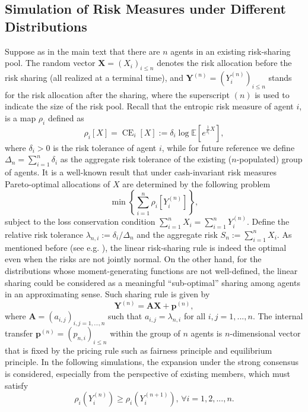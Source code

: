 \documentclass[fleqn,mnsc,nonblindrev]{informs4}
\newcommand{\CE}{\operatorname{CE}}
\begin{document}
\subsection{Simulation of Risk Measures under Different Distributions}
Suppose as in the main text that there are $n$ agents in an existing risk-sharing pool. The random vector $\mathbf{X}=(X_i)_{i\leq n}$ denotes the risk allocation before the risk sharing  (all realized at a terminal time), and $\mathbf{Y}^{(n)}=(Y_i^{(n)})_{i\leq n}$ stands for the risk allocation after the sharing, where the superscript $(n)$ is used to indicate the size of the risk pool. Recall that the entropic risk measure of agent $i$, is a map  $\rho_i$ defined as 
\begin{equation*}
\rho_i[X]=\CE_i[X]:=\delta_i\log\mathbb{E}[e^{\frac{1}{\delta_i}X}],
\end{equation*}
where $\delta_i>0$ is the risk tolerance of agent $i$, while for future reference we define $\Delta_n=\sum_{i=1}^n\delta_i$ as the aggregate risk tolerance of the existing ($n$-populated) group of agents. It is a well-known result that under cash-invariant risk measures Pareto-optimal allocations of $X$ are determined by the following problem 
\begin{equation}\label{app:eq:sharingproblem}
\min\left\{\sum_{i=1}^n\rho_i[Y_i^{(n)}]\right\},
\end{equation}
subject to the loss conservation condition $\sum_{i=1}^n X_i=\sum_{i=1}^n Y_i^{(n)}.$ Define the relative risk tolerance $\lambda_{n,i}:=\delta_i/\Delta_n$ and the aggregate risk $S_n:=\sum_{i=1}^n X_i.$ As mentioned before (see e.g. \cite{barrieu2005inf}), the linear risk-sharing rule is indeed the optimal even when the risks are not jointly normal. On the other hand, for the distributions whose moment-generating functions are not well-defined, the linear sharing could be considered as a meaningful ``sub-optimal'' sharing among agents in an approximating sense. Such sharing rule is given by
\begin{equation}
\mathbf{Y}^{(n)}=\mathbf{A}\mathbf{X}+\mathbf{p}^{(n)},
\end{equation}
where $\mathbf{A}=(a_{i,j})_{i,j=1,...,n}$ such that $a_{i,j}=\lambda_{n,i}$ for all $i,j=1,...,n$. The internal transfer $\mathbf{p}^{(n)}=(p_{n,i})_{i\leq n}$ within the group of $n$ agents is $n$-dimensional vector that is fixed by the pricing rule such as fairness principle and equilibrium principle. In the following simulations, the expansion under the strong consensus is considered, especially from the perspective of existing members, which must satisfy
\begin{equation}
\rho_i(Y_i^{(n)})\geq \rho_i(Y_i^{(n+1)}),\,  \forall i=1,2,...,n.
\end{equation}
\end{document}
